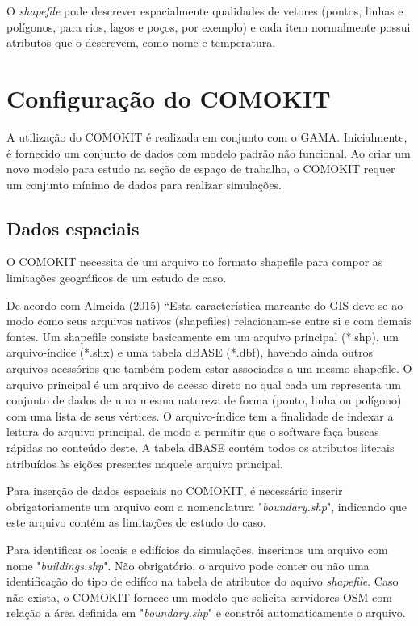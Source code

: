 
O \textit{shapefile} pode descrever espacialmente qualidades de vetores (pontos, linhas e polígonos, para rios, lagos e poços, por exemplo) e cada item normalmente possui atributos que o descrevem, como nome e temperatura. \cite{41Format2:online}


\section{Configuração do COMOKIT}

A utilização do COMOKIT é realizada em conjunto com o GAMA. Inicialmente, é fornecido um conjunto de dados com modelo padrão não funcional. 
Ao criar um novo modelo para estudo na seção de espaço de trabalho, o COMOKIT requer um conjunto mínimo de dados \cite{ComokitDoc} para realizar simulações.

\subsection{Dados espaciais}

O COMOKIT necessita de um arquivo no formato shapefile para compor as limitações geográficos de um estudo de caso. 

De acordo com Almeida (2015) “Esta característica marcante do GIS deve-se ao modo como seus arquivos nativos (shapefiles) relacionam-se entre si e com demais fontes. Um shapefile consiste basicamente em um arquivo principal (*.shp), um arquivo-índice (*.shx) e uma tabela dBASE (*.dbf), havendo ainda outros arquivos acessórios que também podem estar associados a um mesmo shapefile. O arquivo principal é um arquivo de acesso direto no qual cada um representa um conjunto de dados de uma mesma natureza de forma (ponto, linha ou polígono) com uma lista de seus vértices. O arquivo-índice tem a finalidade de indexar a leitura do arquivo principal, de modo a permitir que o software faça buscas rápidas no conteúdo deste. A tabela dBASE contém todos os atributos literais atribuídos às eições presentes naquele arquivo principal. \cite{almeida2015integraccao}

Para inserção de dados espaciais no COMOKIT, é necessário inserir obrigatoriamente um arquivo com a nomenclatura "\textit{boundary.shp}", indicando que este arquivo contém as limitações de estudo do caso.

Para identificar os locais e edifícios da simulações, inserimos um arquivo com nome "\textit{buildings.shp}". Não obrigatório, o arquivo pode conter ou não uma identificação do tipo de edifíco na tabela de atributos do aquivo \textit{shapefile}. Caso não exista, o COMOKIT fornece um modelo que solicita servidores OSM com relação
a área definida em "\textit{boundary.shp}" e constrói automaticamente o arquivo.

